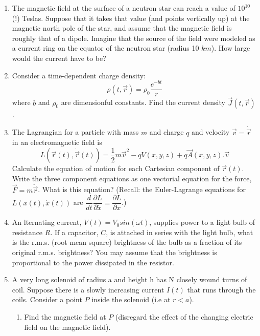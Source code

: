\documentclass[fleqn]{article}
\begin{document}
  \begin{enumerate}
    \item The magnetic field at the surface of a neutron star can reach a value of $10^10$ (!) Teslas. Suppose that it takes that value 
    (and points vertically up) at the magnetic north pole of the star, and assume that the magnetic field is roughly that of a dipole. 
    Imagine that the source of the field were modeled as a current ring on the equator of the neutron star (radius 10 $km$). How large 
    would the current have to be?


    \item Consider a time-dependent charge density:
    $$
      \rho(t, \overrightarrow{r})=\rho_0 \dfrac{e^{-bt}}{r}
    $$
    where $b$ and $\rho_0$ are dimensionful constants. Find the current density $\overrightarrow{J}(t, \overrightarrow{r})$.



    \item The Lagrangian for a particle with mass $m$ and charge $q$ and velocity 
    $\overrightarrow{v}=\dot{\overrightarrow{r}}$ in an electromagnetic field is
    $$
      L\left(
        \overrightarrow{r}(t), \dot{\overrightarrow{r}}(t)
      \right)=\dfrac{1}{2} m \overrightarrow{v}^2-qV(x,y,z)+q \overrightarrow{A}(x,y,z).\overrightarrow{v}
    $$
    Calculate the equation of motion for each Cartesian component of $\overrightarrow{r}(t)$. Write the three 
    component equations as one vectorial equation for the force, $\overrightarrow{F}=m \ddot{\overrightarrow{r}}$. 
    What is this equation? (Recall: the Euler-Lagrange equations for $L\left(x(t), \dot{x}(t)\right)$ are 
    $\dfrac{d}{dt} \dfrac{\partial L}{\partial \dot{x}}=\dfrac{\partial L}{\partial x}$.)

    \item An lternating current, $V(t)=V_0 sin(\omega t)$, supplies power to a light bulb of resistance $R$. 
    If a capacitor, $C$, is attached in series with the light bulb, what is the r.m.s. (root mean square) 
    brightness of the bulb as a fraction of its original r.m.s. brightness? You may assume that
    the brightness is proportional to the power dissipated in the resistor.


    \item A very long solenoid of radius a and height h has N closely wound turns of coil. Suppose there is a 
    slowly increasing current $I(t)$ that runs through the coils. Consider a point $P$ inside the solenoid 
    (i.e at $r < a$).
    \begin{enumerate}
      \item Find the magnetic field at $P$ (disregard the effect of the changing
      electric field on the magnetic field).



\end{enumerate}
\end{enumerate}
\end{document}

